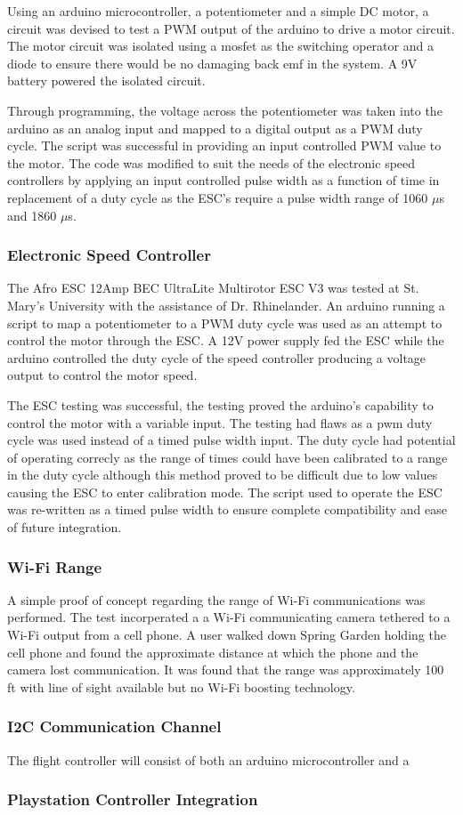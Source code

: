 Using an arduino microcontroller, a potentiometer and a simple DC motor, a circuit was devised to test a PWM output of the arduino to drive a motor circuit. The motor circuit was isolated using a mosfet as the switching operator and a diode to ensure there would be no damaging back emf in the system. A 9V battery powered the isolated circuit.
  
Through programming, the voltage across the potentiometer was taken into the arduino as an analog input and mapped to a digital output as a PWM duty cycle. The script was successful in providing an input controlled PWM value to the motor. The code was modified to suit the needs of the electronic speed controllers by applying an input controlled pulse width as a function of time in replacement of a duty cycle as the ESC's require a pulse width range of 1060 $\mu$s and 1860 $\mu$s.
  
  \subsubsection{Electronic Speed Controller}
  
The Afro ESC 12Amp BEC UltraLite Multirotor ESC V3 was tested at St. Mary's University with the assistance of Dr. Rhinelander. An arduino running a script to map a potentiometer to a PWM duty cycle was used as an attempt to control the motor through the ESC. A 12V power supply fed the ESC while the arduino controlled the duty cycle of the speed controller producing a voltage output to control the motor speed. 

The ESC testing was successful, the testing proved the arduino's capability to control the motor with a variable input. The testing had flaws as a pwm duty cycle was used instead of a timed pulse width input. The duty cycle had potential of operating correcly as the range of times could have been calibrated to a range in the duty cycle although this method proved to be difficult due to low values causing the ESC to enter calibration mode. The script used to operate the ESC was re-written as a timed pulse width to ensure complete compatibility and ease of future integration.

  \subsubsection{Wi-Fi Range}
  
  A simple proof of concept regarding the range of Wi-Fi communications was performed. The test incorperated a a Wi-Fi communicating camera tethered to a Wi-Fi output from a cell phone. A user walked down Spring Garden holding the cell phone and found the approximate distance at which the phone and the camera lost communication. It was found that the range was approximately 100 ft with line of sight available but no Wi-Fi boosting technology.
  
  \subsubsection{I2C Communication Channel}
  
  The flight controller will consist of both an arduino microcontroller and a 
  
  
  \subsubsection{Playstation Controller Integration}

